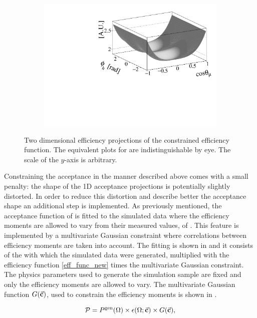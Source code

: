 \begin{figure}[t]
\begin{subfigure}{0.5\textwidth}
    \includegraphics[width=\textwidth]{Figures/Chapter4/canv_cosThL_phi_Sim08_3fb_hel_negKaons_all.pdf}
    \caption{}
    \label{eff2D_lp}
  \end{subfigure}
\caption{Two dimensional efficiency projections of the constrained efficiency function.
         The equivalent plots for \BsbarJpsiKst are indistinguishable by eye. The scale of the $y$-axis is arbitrary.}
    \label{eff2D}
\end{figure}

Constraining the acceptance in the manner described above comes with a small penalty: the shape of the 1D acceptance
projections is potentially slightly distorted. In order to reduce this distortion and describe better the acceptance
shape an additional step is implemented. As previously mentioned, the acceptance function of  is
fitted to the simulated data where the efficiency moments are allowed to vary from their measured values, of .
This feature is implemented by a multivariate Gaussian constraint where correlations between efficiency moments are taken into account.
The fitting \pdf is shown in  and it consists of the \pdf with which the simulated
data were generated, multiplied with the efficiency function \eqref{eff_func_new} times the multivariate Gaussian constraint.
The physics parameters used to generate the simulation sample are fixed and only the efficiency moments are allowed to vary.
The multivariate Gaussian function $G(\vec{\bf{c}})$, used to constrain the efficiency moments is shown in .

\begin{equation}
  \centering
  \mathcal{P}= \Pgen \times\epsilon(\Omega;\vec{\bf c})  \times G(\vec{\bf{c}}),
  \label{mvm_constr}
\end{equation}

